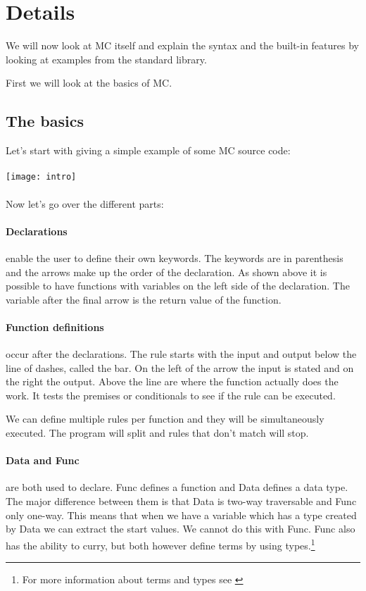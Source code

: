 \section{Details}
We will now look at MC itself and explain the syntax and the built-in features by looking at examples from the standard library.

First we will look at the basics of MC.

\subsection{The basics}
Let's start with giving a simple example of some MC source code:

\paragraph{}
\texttt{[image: intro]}

\paragraph{}
Now let's go over the different parts:

\paragraph{Declarations}
enable the user to define their own keywords.
The keywords are in parenthesis and the arrows make up the order of the declaration.
As shown above it is possible to have functions with variables on the left side of the declaration.
The variable after the final arrow is the return value of the function.

\paragraph{Function definitions}
occur after the declarations.
The rule starts with the input and output below the line of dashes, called the bar.
On the left of the arrow the input is stated and on the right the output.
Above the line are where the function actually does the work.
It tests the premises or conditionals to see if the rule can be executed.

We can define multiple rules per function and they will be simultaneously executed.
The program will split and rules that don't match will stop.

\paragraph{Data and Func}
are both used to declare. Func defines a function and Data defines a data type.
The major difference between them is that Data is two-way traversable and Func only one-way.
This means that when we have a variable which has a type created by Data we can extract the start values.
We cannot do this with Func.
Func also has the ability to curry, but both however define terms by using types.\footnote{For more information about terms and types see \cite{pierce2002types}}

